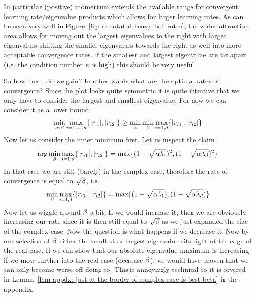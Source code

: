 In particular (positive) momentum extends the available range for convergent
learning rate/eigenvalue products which allows for larger learning rates. As
can be seen very well in Figure~\ref{fig: annotated heavy ball rates}, the
wider attraction area allows for moving out the largest eigenvalues to the
right with larger eigenvalues shifting the smaller eigenvalues towards the
right as well into more acceptable convergence rates. If the smallest and
largest eigenvalue are far apart (i.e. the condition number \(\kappa\) is
high) this should be very useful.

So how much do we gain? In other words what are the optimal rates of
convergence? Since the plot looks quite symmetric it is quite intuitive that
we only have to consider the largest and smallest eigenvalue. For now we
can consider it as a lower bound:
\begin{align}\label{eq: lower bound best heavy ball rates}
	\min_{\alpha,\beta}\max_{i=1,\dots,d}\{|r_{i1}|,|r_{i2}|\}
	\ge \min_{\alpha}\min_{\beta}
	\max_{i=1,d}\{|r_{i1}|,|r_{i2}|\}
\end{align}
Now let us consider the inner minimum first. Let us inspect the claim
\begin{align}\label{eq: optimal heavy ball momentum - ev representation}
	\arg\min_{\beta}\max_{i=1,d}\{|r_{i1}|,|r_{i2}|\}
	= \max\{(1-\sqrt{\alpha\lambda_1})^2, (1-\sqrt{\alpha\lambda_d})^2\}
\end{align}
In that case we are still (barely) in the complex case, therefore the rate
of convergence is equal to \(\sqrt{\beta}\), i.e.
\begin{align*}
	\min_{\beta}\max_{i=1,d}\{|r_{i1}|,|r_{i2}|\}
	= \max\{(1-\sqrt{\alpha\lambda_1}), (1-\sqrt{\alpha\lambda_d})\}
\end{align*}
Now let us wiggle around \(\beta\) a bit. If we would increase it, then
we are obviously increasing our rate since it is then still equal to
\(\sqrt{\beta}\) as we just expanded the size of the complex case. Now the
question is what happens if we decrease it. Now by our selection of \(\beta\)
either the smallest or largest eigenvalue sits right at the edge of the real 
case. If we can show that our absolute eigenvalue maximum is increasing if
we move further into the real case (decrease \(\beta\)), we would have
proven that we can only become worse off doing so. This is annoyingly technical
so it is covered in Lemma~\ref{lem-appdx: just at the border of complex case is
best beta} in the appendix.

